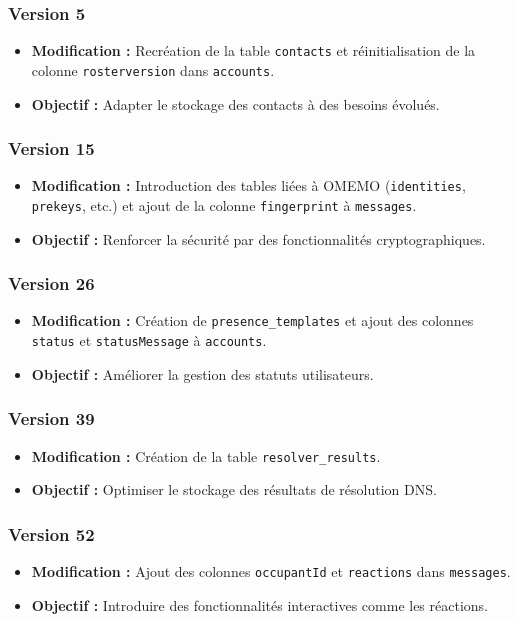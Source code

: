 \documentclass[a4paper,11pt]{article}
\begin{document}
\subsubsection*{Version 5}
\begin{itemize}
    \item \textbf{Modification :} Recréation de la table \texttt{contacts} et réinitialisation de la colonne \texttt{rosterversion} dans \texttt{accounts}.
    \item \textbf{Objectif :} Adapter le stockage des contacts à des besoins évolués.
\end{itemize}

\subsubsection*{Version 15}
\begin{itemize}
    \item \textbf{Modification :} Introduction des tables liées à OMEMO (\texttt{identities}, \texttt{prekeys}, etc.) et ajout de la colonne \texttt{fingerprint} à \texttt{messages}.
    \item \textbf{Objectif :} Renforcer la sécurité par des fonctionnalités cryptographiques.
\end{itemize}

\subsubsection*{Version 26}
\begin{itemize}
    \item \textbf{Modification :} Création de \texttt{presence\_templates} et ajout des colonnes \texttt{status} et \texttt{statusMessage} à \texttt{accounts}.
    \item \textbf{Objectif :} Améliorer la gestion des statuts utilisateurs.
\end{itemize}

\subsubsection*{Version 39}
\begin{itemize}
    \item \textbf{Modification :} Création de la table \texttt{resolver\_results}.
    \item \textbf{Objectif :} Optimiser le stockage des résultats de résolution DNS.
\end{itemize}

\subsubsection*{Version 52}
\begin{itemize}
    \item \textbf{Modification :} Ajout des colonnes \texttt{occupantId} et \texttt{reactions} dans \texttt{messages}.
    \item \textbf{Objectif :} Introduire des fonctionnalités interactives comme les réactions.
\end{itemize}
\end{document}
